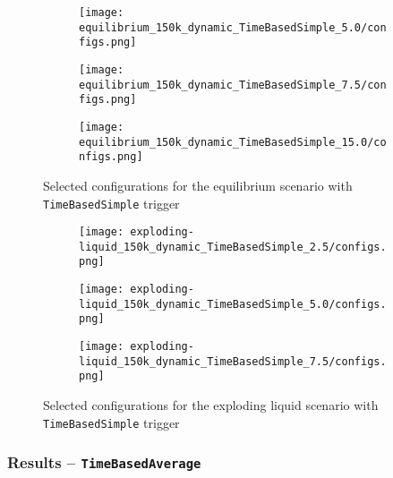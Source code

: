 \documentclass[]{article}
\begin{document}
\begin{figure}[H]
	\begin{center}
		\begin{subfigure}[b]{0.3\textwidth}
			\texttt{[image: equilibrium\_150k\_dynamic\_TimeBasedSimple\_5.0/configs.png]}
		\end{subfigure}
		\begin{subfigure}[b]{0.3\textwidth}
			\texttt{[image: equilibrium\_150k\_dynamic\_TimeBasedSimple\_7.5/configs.png]}
		\end{subfigure}
		\begin{subfigure}[b]{0.3\textwidth}
			\texttt{[image: equilibrium\_150k\_dynamic\_TimeBasedSimple\_15.0/configs.png]}
		\end{subfigure}
	\end{center}
	\caption[]{Selected configurations for the equilibrium scenario with \texttt{TimeBasedSimple} trigger}
	\label{fig_equil_configs_dyn}
\end{figure}

\begin{figure}[H]
	\begin{center}
		\begin{subfigure}[b]{0.3\textwidth}
			\texttt{[image: exploding-liquid\_150k\_dynamic\_TimeBasedSimple\_2.5/configs.png]}
		\end{subfigure}
		\begin{subfigure}[b]{0.3\textwidth}
			\texttt{[image: exploding-liquid\_150k\_dynamic\_TimeBasedSimple\_5.0/configs.png]}
		\end{subfigure}
		\begin{subfigure}[b]{0.3\textwidth}
			\texttt{[image: exploding-liquid\_150k\_dynamic\_TimeBasedSimple\_7.5/configs.png]}
		\end{subfigure}
	\end{center}
	\caption[]{Selected configurations for the exploding liquid scenario with \texttt{TimeBasedSimple} trigger}
	\label{fig_expl_configs_dyn}
\end{figure}


\subsubsection{Results -- \texttt{TimeBasedAverage}}
\end{document}
